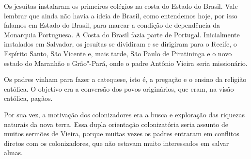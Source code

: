 Os jesuítas instalaram os primeiros colégios na costa do Estado do
Brasil. Vale lembrar que ainda não havia a ideia de Brasil, como
entendemos hoje, por isso falamos em Estado do Brasil, para marcar a
condição de dependência da Monarquia Portuguesa. A Costa do Brasil fazia
parte de Portugal. Inicialmente instalados em Salvador, os jesuítas se
dividiram e se dirigiram para o Recife, o Espírito Santo, São Vicente e,
mais tarde, São Paulo de Piratininga e o novo estado do Maranhão e
Grão"-Pará, onde o padre Antônio Vieira seria missionário.

Os padres vinham para fazer a catequese, isto é, a pregação e o ensino
da religião católica. O objetivo era a conversão dos povos originários,
que eram, na visão católica, pagãos.

Por sua vez, a motivação dos colonizadores era a busca e exploração das
riquezas naturais da nova terra. Essa dupla orientação colonizatória
seria assunto de muitos sermões de Vieira, porque muitas vezes os padres
entraram em conflitos diretos com os colonizadores, que não estavam
muito interessados em salvar almas.